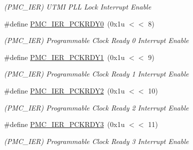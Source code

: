 \begin{DoxyCompactItemize}
\begin{DoxyCompactList}\small\item\em (P\+M\+C\+\_\+\+I\+ER) U\+T\+MI P\+LL Lock Interrupt Enable \end{DoxyCompactList}\item 
\mbox{\label{group__SAME70__PMC_gaf4dc63611af547b0f83ab274c2d4752e}} 
\#define \mbox{\hyperlink{group__SAME70__PMC_gaf4dc63611af547b0f83ab274c2d4752e}{P\+M\+C\+\_\+\+I\+E\+R\+\_\+\+P\+C\+K\+R\+D\+Y0}}~(0x1u $<$$<$ 8)
\begin{DoxyCompactList}\small\item\em (P\+M\+C\+\_\+\+I\+ER) Programmable Clock Ready 0 Interrupt Enable \end{DoxyCompactList}\item 
\mbox{\label{group__SAME70__PMC_gaeeab0f98979c5b8f870eeee57982c244}} 
\#define \mbox{\hyperlink{group__SAME70__PMC_gaeeab0f98979c5b8f870eeee57982c244}{P\+M\+C\+\_\+\+I\+E\+R\+\_\+\+P\+C\+K\+R\+D\+Y1}}~(0x1u $<$$<$ 9)
\begin{DoxyCompactList}\small\item\em (P\+M\+C\+\_\+\+I\+ER) Programmable Clock Ready 1 Interrupt Enable \end{DoxyCompactList}\item 
\mbox{\label{group__SAME70__PMC_ga24a074ed0f89ac6b1509943b02659d3b}} 
\#define \mbox{\hyperlink{group__SAME70__PMC_ga24a074ed0f89ac6b1509943b02659d3b}{P\+M\+C\+\_\+\+I\+E\+R\+\_\+\+P\+C\+K\+R\+D\+Y2}}~(0x1u $<$$<$ 10)
\begin{DoxyCompactList}\small\item\em (P\+M\+C\+\_\+\+I\+ER) Programmable Clock Ready 2 Interrupt Enable \end{DoxyCompactList}\item 
\mbox{\label{group__SAME70__PMC_gacae87261dc9fb52ec79a1a380fcdf8fd}} 
\#define \mbox{\hyperlink{group__SAME70__PMC_gacae87261dc9fb52ec79a1a380fcdf8fd}{P\+M\+C\+\_\+\+I\+E\+R\+\_\+\+P\+C\+K\+R\+D\+Y3}}~(0x1u $<$$<$ 11)
\begin{DoxyCompactList}\small\item\em (P\+M\+C\+\_\+\+I\+ER) Programmable Clock Ready 3 Interrupt Enable \end{DoxyCompactList}\item 
\mbox{\label{group__SAME70__PMC_ga31be9f0cda08e0f5d90c39f9a45e3401}} 

\end{DoxyCompactItemize}
